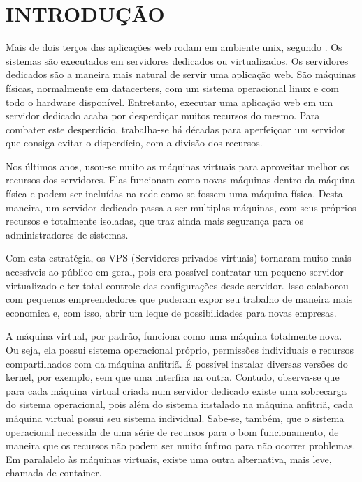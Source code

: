 \documentclass[
	12pt,				%
	openright,			%
	oneside,			%
	a4paper,			%
	chapter=TITLE,		%
	section=TITLE,		%
	english,			%
	french,				%
	spanish,			%
	brazil				%
	]{abntex2}
\begin{document}
\tableofcontents*
\clearpage

\textual



\chapter{INTRODUÇÃO}

Mais de dois terços das aplicações web rodam em ambiente unix, segundo . Os sistemas são executados em servidores dedicados ou virtualizados. Os servidores dedicados são a maneira mais natural de servir uma aplicação web. São máquinas físicas, normalmente em datacerters, com um sistema operacional linux e com todo o hardware disponível.
Entretanto, executar uma aplicação web em um servidor dedicado acaba por desperdiçar muitos recursos do mesmo. Para combater este desperdício, trabalha-se há décadas para aperfeiçoar um servidor que consiga evitar o disperdício, com a divisão dos recursos.

Nos últimos anos, usou-se muito as máquinas virtuais para aproveitar melhor os recursos dos servidores. Elas funcionam como novas máquinas dentro da máquina física e podem ser incluídas na rede como se fossem uma máquina física. Desta maneira, um servidor dedicado passa a ser multiplas máquinas, com seus próprios recursos e totalmente isoladas, que traz ainda mais segurança para os administradores de sistemas.

Com esta estratégia, os VPS (Servidores privados virtuais) tornaram muito mais acessíveis ao público em geral, pois era possível contratar um pequeno servidor virtualizado e ter total controle das configurações desde servidor. Isso colaborou com pequenos empreendedores que puderam expor seu trabalho de maneira mais economica e, com isso, abrir um leque de possibilidades para novas empresas.

A máquina virtual, por padrão, funciona como uma máquina totalmente nova. Ou seja, ela possui sistema operacional próprio, permissões individuais e recursos compartilhados com da máquina anfitriã. É possível instalar diversas versões do kernel, por exemplo, sem que uma interfira na outra. Contudo, observa-se que para cada máquina virtual criada num servidor dedicado existe uma sobrecarga do sistema operacional, pois além do sistema instalado na máquina anfitriã, cada máquina virtual possui seu sistema individual. Sabe-se, também, que o sistema operacional necessida de uma série de recursos para o bom funcionamento, de maneira que os recursos não podem ser muito ínfimo para não ocorrer problemas. Em paralalelo às máquinas virtuais, existe uma outra alternativa, mais leve, chamada de container.
\end{document}
